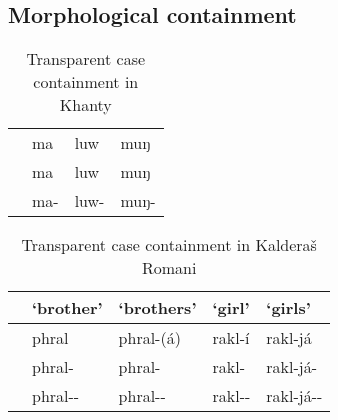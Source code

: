 \subsection{Morphological containment}

\begin{table}[h]
  \center
	\caption {Transparent case containment in Khanty \citep[16]{nikolaeva1999}}
	\begin{minipage}{0.7\linewidth}
		\begin{tabularx}{\textwidth}{c *{3}{Z}}
		\toprule
              & 
              & 
              &                                \\
		\midrule
     & ma
              & luw
              & muŋ                                     \\
     & ma
              & luw
              & muŋ                           \\
     & ma-\textcolor{DG}{}
              & luw-\textcolor{DG}{}
              & muŋ-\textcolor{DG}{}  \\
		\bottomrule
		\end{tabularx}
	\end{minipage}
\end{table}



\begin{table}[h]
  \center
	\caption {Transparent case containment in Kalderaš Romani \citep[31-46]{boretzky1994}}
	\begin{minipage}{0.9\linewidth}
		\begin{tabularx}{\textwidth}{c *{4}{Z}}
		\toprule
              & `brother'
              & `brothers'
              & `girl'
              & `girls'                                   \\
		\midrule
     & phral
              & phral-(á)
              & rakl-í
              & rakl-já                                   \\
     & phral-
              & phral-
              & rakl-
              & rakl-já-                           \\
     & phral--\textcolor{DG}{}
              & phral--\textcolor{DG}{}
              & rakl--\textcolor{DG}{}
              & rakl-já--\textcolor{DG}{}  \\
		\bottomrule
		\end{tabularx}
	\end{minipage}
\end{table}


